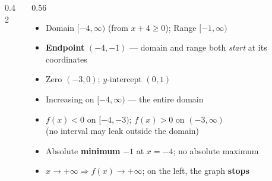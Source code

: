 \documentclass[aspectratio=169, 11pt]{beamer}
\newcommand{\lgrid}[4]{%
  \draw[step=1, linegray!45, thin] (#1,#3) grid (#2,#4);
  \draw[->, thick, charcoal] (#1,0)--(#2,0) node[below right, font=\tiny]{$x$};
  \draw[->, thick, charcoal] (0,#3)--(0,#4) node[left, font=\tiny]{$y$};}
\begin{document}
\begin{frame}[t, plain]
  \begin{columns}[T]
    \begin{column}{0.42\textwidth}
      \centering
    \end{column}
    \begin{column}{0.56\textwidth}
      \footnotesize
      \begin{itemize}\setlength{\itemsep}{3pt}
        \item Domain $[-4,\infty)$ \; (from $x+4\ge0$); \; Range $[-1,\infty)$
        \item \textbf{Endpoint} $(-4,-1)$ --- domain and range both \emph{start} at its coordinates
        \item Zero $(-3,0)$; \; $y$-intercept $(0,1)$
        \item Increasing on $[-4,\infty)$ --- the entire domain
        \item $f(x)<0$ on $[-4,-3)$; \; $f(x)>0$ on $(-3,\infty)$ \\
              {\scriptsize (no interval may leak outside the domain)}
        \item Absolute \textbf{minimum} $-1$ at $x=-4$; no absolute maximum
        \item $x\to+\infty \Rightarrow f(x)\to+\infty$; \; on the left, the graph \textbf{stops}
      \end{itemize}
    \end{column}
  \end{columns}
\end{frame}
\end{document}
